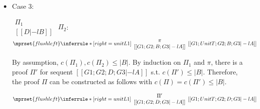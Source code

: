 \begin{itemize}
\item Case 3:
      \begin{center}
        \scriptsize
        \begin{math}
          \begin{array}{c}
            \Pi_1 \\
            {[[D |-l B]]}
          \end{array}
        \end{math}
        \qquad\qquad
        $\Pi_2$:
        \begin{math}
          $$\mprset{flushleft}
          \inferrule* [right={\tiny unitL1}] {
            {
              \begin{array}{c}
                \pi \\
                {[[G1; G2; B; G3 |-l A]]}
              \end{array}
            }
          }{[[G1; UnitT; G2; B; G3 |-l A]]}
        \end{math}
      \end{center}
      By assumption, $c(\Pi_1),c(\Pi_2)\leq |B|$. By induction on $\Pi_1$
      and $\pi$, there is a proof $\Pi'$ for sequent
      $[[G1; G2; D; G3 |-l A]]$
      s.t. $c(\Pi') \leq |B|$. Therefore, the proof $\Pi$ can be
      constructed as follows with $c(\Pi) = c(\Pi') \leq |B|$.
      \begin{center}
        \scriptsize
        \begin{math}
          $$\mprset{flushleft}
          \inferrule* [right={\tiny unitL1}] {
            {
              \begin{array}{c}
                \Pi' \\
                {[[G1; G2; D; G3 |-l A]]}
              \end{array}
            }
          }{[[G1; UnitT; G2; D; G3 |-l A]]}
        \end{math}
      \end{center}
\end{itemize}

